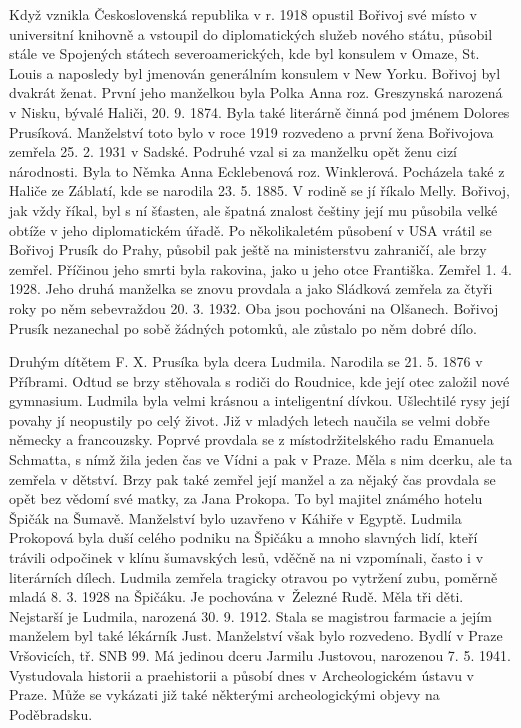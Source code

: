 \documentclass[../dejiny-rodu-prusiku.tex]{subfiles}
\begin{document}
Když vznikla Československá republika v r. 1918 opustil Bořivoj své místo v universitní knihovně a vstoupil do diplomatických služeb nového státu, působil stále ve Spojených státech severoamerických, kde byl konsulem v Omaze, St. Louis a naposledy byl jmenován generálním konsulem v New Yorku. Bořivoj byl dvakrát ženat. První jeho manželkou byla Polka Anna roz. Greszynská narozená v Nisku, bývalé Haliči, 20. 9. 1874. Byla také literárně činná pod jménem Dolores Prusíková. Manželství toto bylo v roce 1919 rozvedeno a první žena Bořivojova zemřela 25. 2. 1931 v Sadské. Podruhé vzal si za manželku opět ženu cizí národnosti. Byla to Němka Anna Ecklebenová roz. Winklerová. Pocházela také z Haliče ze Záblatí, kde se narodila 23. 5. 1885. V rodině se jí říkalo Melly. Bořivoj, jak vždy říkal, byl s ní šťasten, ale špatná znalost češtiny její mu působila velké obtíže v jeho diplomatic­kém úřadě. Po několikaletém působení v USA vrátil se Bořivoj Prusík do Prahy, působil pak ještě na minister­stvu zahraničí, ale brzy zemřel. Příčinou jeho smrti byla rakovina, jako u jeho otce Františka. Zemřel 1. 4. 1928. Jeho druhá manželka se znovu provdala a jako Sládková zemřela za čtyři roky po něm sebevraždou 20. 3. 1932. Oba jsou pochováni na Olšanech. Bořivoj Prusík nezanechal po sobě žádných potomků, ale zůstalo po něm dobré dílo.

Druhým dítětem F. X. Prusíka byla dcera Ludmila. Narodila se 21. 5. 1876 v Příbrami. Odtud se brzy stěhovala s ro­diči do Roudnice, kde její otec založil nové gymnasium. Ludmila byla velmi krásnou a inteligentní dívkou. Ušlechtilé rysy její povahy jí neopustily po celý život. Již v mladých letech naučila se velmi dobře německy a francouzsky. Poprvé provdala se z místodržitelského radu Emanuela Schmatta, s nímž žila jeden čas ve Vídni a pak v Praze. Měla s nim dcerku, ale ta zemřela v dětství. Brzy pak také zemřel její manžel a za nějaký čas provda­la se opět bez vědomí své matky, za Jana Prokopa. To byl
majitel známého hotelu Špičák na Šumavě. Manželství bylo uzavřeno v Káhiře v Egyptě. Ludmila Prokopová byla duší celého podniku na Špičáku a mnoho slavných lidí, kteří trávili odpočinek v klínu šumavských lesů, vděčně na ni vzpomínali, často i v literárních dílech. Ludmila zemřela tragicky otravou po vytržení zubu, poměrně mladá 8. 3. 1928 na Špičáku. Je pochována v Železné Rudě. Měla tři děti. Nejstarší je Ludmila, narozená 30. 9. 1912. Stala se magistrou farmacie a jejím manželem byl také lékárník Just. Manželství však bylo rozvedeno. Bydlí v Praze Vršovicích, tř. SNB 99. Má jedinou dceru Jarmilu Justovou, narozenou 7. 5. 1941. Vystudovala historii a praehistorii a působí dnes v Archeologickém ústa­vu v Praze. Může se vykázati již také některými archeologickými objevy na Poděbradsku.
\end{document}
